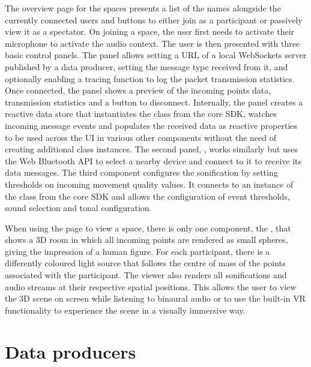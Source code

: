 The overview page for the spaces presents a list of the names alongside the currently connected users and buttons to either join as a participant or passively view it as a spectator.
On joining a space, the user first needs to activate their microphone to activate the audio context.
The user is then presented with three basic control panels.
The  panel allows setting a URL of a local WebSockets server published by a data producer, setting the message type received from it, and optionally enabling a tracing function to log the packet transmission statistics.
Once connected, the panel shows a preview of the incoming points data, transmission statistics and a button to disconnect.
Internally, the panel creates a reactive data store that instantiates the  class from the core \ac{SDK}, watches incoming message events and populates the received data as reactive properties to be used across the \ac{UI} in various other components without the need of creating additional class instances.
The second panel, , works similarly but uses the Web Bluetooth \ac{API} to select a nearby device and connect to it to receive its data messages.
The third component configures the sonification by setting thresholds on incoming movement quality values.
It connects to an instance of the  class from the core \ac{SDK} and allows the configuration of event thresholds, sound selection and tonal configuration.

When using the page to view a space, there is only one component, the , that shows a \ac{3D} room in which all incoming points are rendered as small spheres, giving the impression of a human figure.
For each participant, there is a differently coloured light source that follows the centre of mass of the points associated with the participant.
The viewer also renders all sonifications and audio streams at their respective spatial positions.
This allows the user to view the \ac{3D} scene on screen while listening to binaural audio or to use the built-in \ac{VR} functionality to experience the scene in a visually immersive way.

\section{Data producers}
\label{sec:data-producers}

